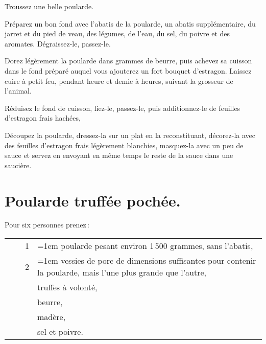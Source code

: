 Troussez une belle poularde.

Préparez un bon fond avec l'abatis de la poularde, un abatis supplémentaire, du
jarret et du pied de veau, des légumes, de l’eau, du sel, du poivre et des
aromates. Dégraissez-le, passez-le.

Dorez légèrement la poularde dans {\mmm} grammes de beurre, puis achevez sa cuisson
dans le fond préparé auquel vous ajouterez un fort bouquet d’estragon. Laissez
cuire à petit feu, pendant {\mmm} heure et demie à {\mmm} heures, suivant la grosseur de
l'animal.

Réduisez le fond de cuisson, liez-le, passez-le, puis additionnez-le de
feuilles d'estragon frais hachées,

Découpez la poularde, dressez-la sur un plat en la reconstituant, décorez-la
avec des feuilles d'estragon frais légèrement blanchies, masquez-la avec un peu
de sauce et servez en envoyant en même temps le reste de la sauce dans une
saucière.

\section*{\centering Poularde truffée pochée.}
{}

Pour six personnes prenez :

\medskip

\footnotesize
\begin{longtable}{rrrp{20em}}
        &         &  1 & \hangindent=1em poularde pesant environ 1 500 grammes, sans l'abatis,            \\
        &         &  2 & \hangindent=1em vessies de porc de dimensions suffisantes pour contenir
                         la poularde, mais l'une plus grande que l'autre,                                 \\
        &         &    & truffes à volonté,                                                               \\
        &         &    & beurre,                                                                          \\
        &         &    & madère,                                                                          \\
        &         &    & sel et poivre.                                                                   \\
\end{longtable}
\normalsize

